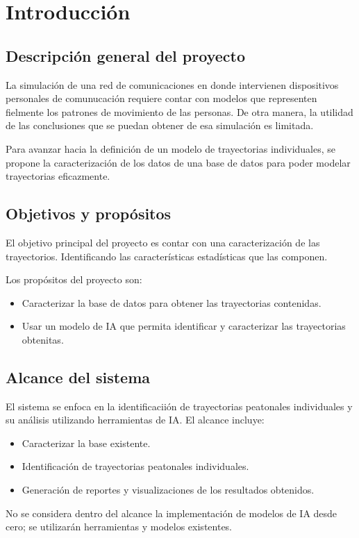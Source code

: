 	\section{Introducci\'on}
	\subsection{Descripci\'on general del proyecto}
	\noindent La simulaci\'on de una red de comunicaciones en donde intervienen dispositivos personales de comunucaci\'on requiere contar con modelos que representen fielmente los patrones de movimiento de las personas. De otra manera, la utilidad de las conclusiones que se puedan obtener de esa simulaci\'on es limitada. 

	\noindent Para avanzar hacia la definici\'on de un modelo de trayectorias individuales, se propone la caracterización de los datos de una base de datos para poder modelar trayectorias eficazmente. 
	
	\subsection{Objetivos y prop\'ositos}
	\noindent El objetivo principal del proyecto es contar con una caracterizaci\'on de las trayectorios. Identificando las caracter\'isticas estad\'isticas que las componen.

	\noindent Los prop\'ositos del proyecto son:
	\begin{itemize}
		\item Caracterizar la base de datos para obtener las trayectorias contenidas.
		\item Usar un modelo de IA que permita identificar y caracterizar las trayectorias obtenitas.
	\end{itemize}

	\subsection{Alcance del sistema}
	\noindent El sistema se enfoca en la identificaciión de trayectorias peatonales individuales y su an\'alisis utilizando herramientas de IA. El alcance incluye:
	\begin{itemize}
		\item Caracterizar la base existente.
		\item Identificación de trayectorias peatonales individuales.
		\item Generaci\'on de reportes y visualizaciones de los resultados obtenidos.
	\end{itemize}
	\noindent No se considera dentro del alcance la implementaci\'on de modelos de IA desde cero; se utilizar\'an herramientas y modelos existentes.

	\newpage